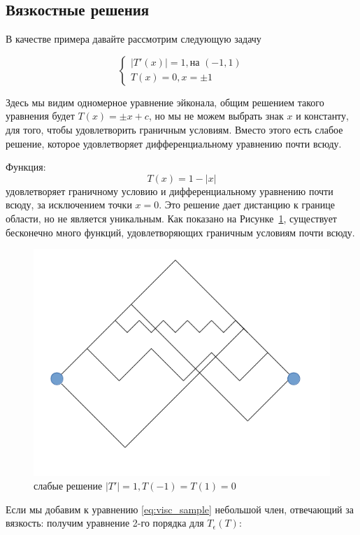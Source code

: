 \subsection{Вязкостные решения}

В качестве примера давайте рассмотрим следующую задачу

\begin{equation}
  \label{eq:visc_sample}
  \left\{ \begin{matrix}
      |T'(x)| = 1,\text{на } (-1,1) \\
      T(x) = 0,x = \pm 1
    \end{matrix}\right.
\end{equation}

Здесь мы видим одномерное уравнение эйконала, общим решением такого
уравнения будет $T(x) = \pm x + c$, но мы не можем выбрать знак $x$ и
константу, для того, чтобы удовлетворить граничным условиям. Вместо
этого есть слабое решение, которое удовлетворяет дифференциальному
уравнению почти всюду.

Функция:
\begin{equation*}
  T(x) = 1 - |x|
\end{equation*}
удовлетворяет граничному условию и дифференциальному уравнению почти
всюду, за исключением точки $x = 0$. Это решение дает дистанцию к
границе области, но не является уникальным. Как показано на
Рисунке~\ref{fig:weak-sol}, существует бесконечно много функций,
удовлетворяющих граничным условиям почти всюду.

\begin{figure}[h]
  \centering
  \includegraphics[width=0.5\linewidth]{img/weak-sol.png}
  \hfil \caption{слабые решение $|T'|=1,T(-1)=T(1)=0$}
  \label{fig:weak-sol}

\end{figure}

Если мы добавим к уравнению \eqref{eq:visc_sample} небольшой член,
отвечающий за вязкость: получим уравнение 2-го порядка для
$T_\epsilon(T)$:

